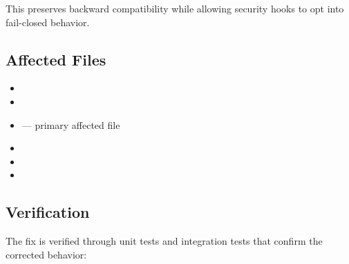 This preserves backward compatibility while allowing security hooks to opt into fail-closed behavior.


\subsection*{Affected Files}
\begin{itemize}
    \item {}
    \item {}
    \item {} — primary affected file
    \item {}
    \item {}
    \item {}
\end{itemize}

\subsection*{Verification}
The fix is verified through unit tests and integration tests that confirm the corrected behavior:

